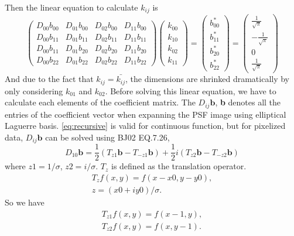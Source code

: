 \documentclass[apj]{emulateapj}
\begin{document}
Then the linear equation to calculate $k_{ij}$ is
\begin{equation}
\begin{pmatrix} D_{00}b_{00}  & D_{01}b_{00} & D_{02}b_{00} & D_{11}b_{00} \\ 
                D_{00}b_{11}  & D_{01}b_{11} & D_{02}b_{11} & D_{11}b_{11} \\
                D_{00}b_{11}  & D_{01}b_{20} & D_{02}b_{20} & D_{11}b_{20} \\
                D_{00}b_{22}  & D_{01}b_{22} & D_{02}b_{22} & D_{11}b_{22}\end{pmatrix} 
                \begin{pmatrix} k_{00} \\ k_{10} \\
                 k_{02} \\ k_{11} \end{pmatrix} =\begin{pmatrix} b^*_{00} \\ b^*_{11} \\
                 b^*_{20} \\ b^*_{22} \end{pmatrix}=
                 \begin{pmatrix} \frac{1}{\sqrt{\pi}}  \\ -\frac{1}{\sqrt{\pi}}  \\
                 0 \\ \frac{1}{\sqrt{\pi}}  \end{pmatrix}
\end{equation}
And due to the fact that $k_{ij}=\bar{k_{ij}}$, the dimensions are shrinked 
dramatically by only considering $k_{01}$ and $k_{02}$.
Before solving this linear equation, we have to calculate each elements of the coefficient 
matrix. The $D_{ij}\textbf{b}$, \textbf{b} denotes all the entries of the coefficient vector
when expanning the PSF image using elliptical Laguerre basis. \ref{eq:recursive} is valid for
continuous function, but for pixelized data, $D_{ij}\textbf{b}$ can be solved using BJ02 EQ.7.26, 
\begin{equation}
D_{10}\textbf{b}=\frac{1}{2}(T_{z1}\textbf{b}-T_{-z1}\textbf{b})+
\frac{1}{2}i(T_{z2}\textbf{b}-T_{-z2}\textbf{b})
\end{equation}
where $z1=1/\sigma$, $z2=i/\sigma$. $T_z$ is defined as the translation operator.
\begin{gather}
T_zf(x,y)=f(x-x0,y-y0),\\
z=(x0+iy0)/\sigma.
\end{gather}
So we have
\begin{gather}
T_{z1}f(x,y)=f(x-1,y),\\
T_{z2}f(x,y)=f(x,y-1).
\end{gather}
\end{document}
